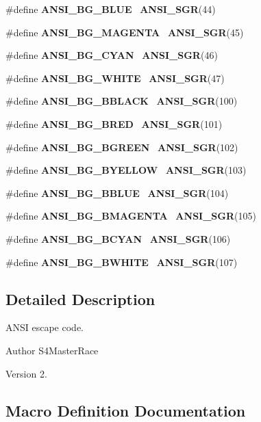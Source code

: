\begin{DoxyCompactItemize}
\item 
\#define \textbf{ A\+N\+S\+I\+\_\+\+B\+G\+\_\+\+B\+L\+UE}~\textbf{ A\+N\+S\+I\+\_\+\+S\+GR}(44)
\item 
\#define \textbf{ A\+N\+S\+I\+\_\+\+B\+G\+\_\+\+M\+A\+G\+E\+N\+TA}~\textbf{ A\+N\+S\+I\+\_\+\+S\+GR}(45)
\item 
\#define \textbf{ A\+N\+S\+I\+\_\+\+B\+G\+\_\+\+C\+Y\+AN}~\textbf{ A\+N\+S\+I\+\_\+\+S\+GR}(46)
\item 
\#define \textbf{ A\+N\+S\+I\+\_\+\+B\+G\+\_\+\+W\+H\+I\+TE}~\textbf{ A\+N\+S\+I\+\_\+\+S\+GR}(47)
\item 
\#define \textbf{ A\+N\+S\+I\+\_\+\+B\+G\+\_\+\+B\+B\+L\+A\+CK}~\textbf{ A\+N\+S\+I\+\_\+\+S\+GR}(100)
\item 
\#define \textbf{ A\+N\+S\+I\+\_\+\+B\+G\+\_\+\+B\+R\+ED}~\textbf{ A\+N\+S\+I\+\_\+\+S\+GR}(101)
\item 
\#define \textbf{ A\+N\+S\+I\+\_\+\+B\+G\+\_\+\+B\+G\+R\+E\+EN}~\textbf{ A\+N\+S\+I\+\_\+\+S\+GR}(102)
\item 
\#define \textbf{ A\+N\+S\+I\+\_\+\+B\+G\+\_\+\+B\+Y\+E\+L\+L\+OW}~\textbf{ A\+N\+S\+I\+\_\+\+S\+GR}(103)
\item 
\#define \textbf{ A\+N\+S\+I\+\_\+\+B\+G\+\_\+\+B\+B\+L\+UE}~\textbf{ A\+N\+S\+I\+\_\+\+S\+GR}(104)
\item 
\#define \textbf{ A\+N\+S\+I\+\_\+\+B\+G\+\_\+\+B\+M\+A\+G\+E\+N\+TA}~\textbf{ A\+N\+S\+I\+\_\+\+S\+GR}(105)
\item 
\#define \textbf{ A\+N\+S\+I\+\_\+\+B\+G\+\_\+\+B\+C\+Y\+AN}~\textbf{ A\+N\+S\+I\+\_\+\+S\+GR}(106)
\item 
\#define \textbf{ A\+N\+S\+I\+\_\+\+B\+G\+\_\+\+B\+W\+H\+I\+TE}~\textbf{ A\+N\+S\+I\+\_\+\+S\+GR}(107)
\end{DoxyCompactItemize}


\subsection{Detailed Description}
A\+N\+SI escape code. 

\begin{DoxyAuthor}{Author}
S4\+Master\+Race 
\end{DoxyAuthor}
\begin{DoxyVersion}{Version}
2. 
\end{DoxyVersion}


\subsection{Macro Definition Documentation}
\mbox{\label{ansi__code_8h_a11f8de0b3879efb27dd0c6a82ebaa5d8}} 
